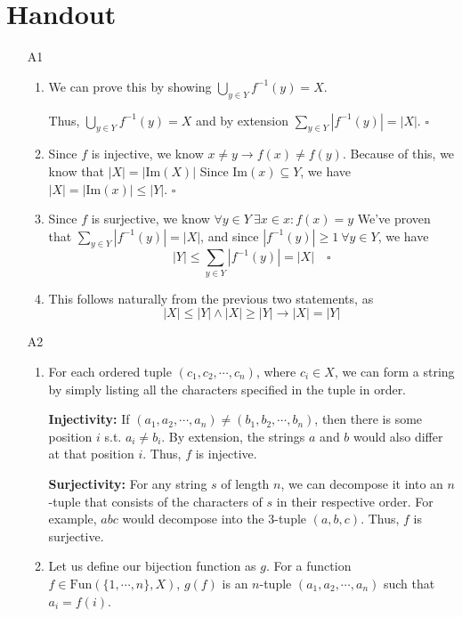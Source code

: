\documentclass[12pt]{article}
\begin{document}
\section{Handout}\label{sec:handout}
\begin{itemize}
      \item[A1] \begin{enumerate}[label=\alph*]
                  \item We can prove this by showing $\bigcup_{y \in Y} f^{-1}(y)=X$.


                        Thus, $\bigcup_{y \in Y} f^{-1}(y)=X$ and by extension $\sum_{y \in Y} |f^{-1}(y)|=|X|$. $\square$
                  \item Since $f$ is injective, we know $x \ne y \rightarrow f(x) \ne f(y)$.
                        Because of this, we know that $|X|=|\text{Im}(X)|$
                        Since $\text{Im}(x) \subseteq Y$, we have $|X|=|\text{Im}(x)|\le |Y|$. $\square$
                  \item Since $f$ is surjective, we know $\forall y \in Y\ \exists x \in x: f(x)=y$
                        We've proven that $\sum_{y \in Y} |f^{-1}(y)|=|X|$, and since $|f^{-1}(y)| \ge 1\ \forall y \in Y$,
                        we have \[|Y| \le \sum_{y \in Y} |f^{-1}(y)|=|X|\quad\square\]
                  \item This follows naturally from the previous two statements, as
                        \[|X| \le |Y| \land |X| \ge |Y| \rightarrow |X|=|Y|\]
            \end{enumerate}
      \item[A2] \begin{enumerate}[label=\alph*]
                  \item For each ordered tuple $(c_1, c_2, \cdots , c_n)$, where $c_i \in X$,
                        we can form a string by simply listing all the characters specified in the tuple in order.

                        \textbf{Injectivity:}
                        If $(a_1, a_2, \cdots , a_n) \ne (b_1, b_2, \cdots , b_n)$, then there is
                        some position $i$ s.t. $a_i \ne b_i$.
                        By extension, the strings $a$ and $b$ would also differ at that position $i$.
                        Thus, $f$ is injective.

                        \textbf{Surjectivity:}
                        For any string $s$ of length $n$, we can decompose it into an $n$-tuple
                        that consists of the characters of $s$ in their respective order.
                        For example, $abc$ would decompose into the $3$-tuple $(a,b,c)$.
                        Thus, $f$ is surjective.
                  \item Let us define our bijection function as $g$.
                        For a function $f \in \text{Fun}(\{1, \cdots , n\}, X)$,
                        $g(f)$ is an $n$-tuple $(a_1, a_2, \cdots , a_n)$ such that $a_i=f(i)$.


\end{enumerate}
\end{itemize}
\end{document}
